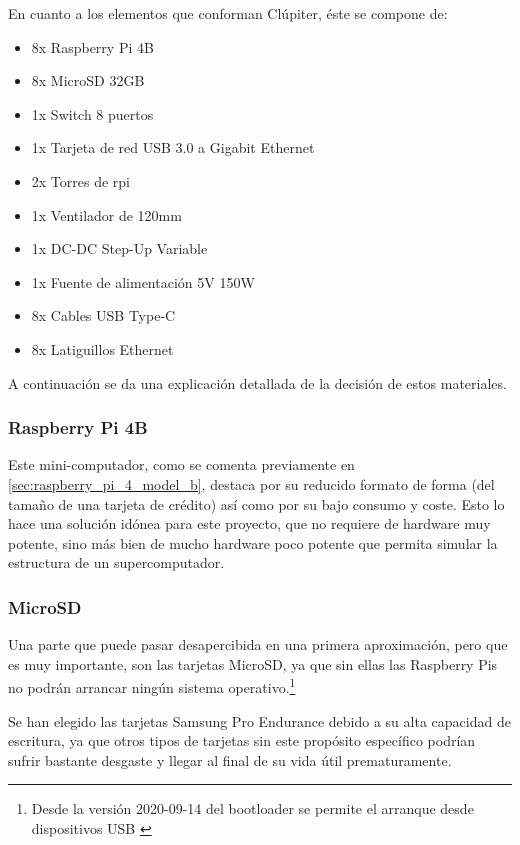 
En cuanto a los elementos que conforman Clúpiter, éste se compone de:
\begin{itemize}
    \item 8x Raspberry Pi 4B
    \item 8x MicroSD 32GB
    \item 1x Switch 8 puertos
    \item 1x Tarjeta de red USB 3.0 a Gigabit Ethernet 
    \item 2x Torres de \acrshort{rpi}
    \item 1x Ventilador de 120mm
    \item 1x DC-DC Step-Up Variable 
    \item 1x Fuente de alimentación 5V 150W
    \item 8x Cables USB Type-C
    \item 8x Latiguillos Ethernet
\end{itemize}

A continuación se da una explicación detallada de la decisión de estos materiales.

\subsubsection{Raspberry Pi 4B}
Este mini-computador, como se comenta previamente en \ref{sec:raspberry_pi_4_model_b}, destaca por su reducido formato de forma (del tamaño de una tarjeta de crédito) así como por su bajo consumo y coste. Esto lo hace una solución idónea para este proyecto, que no requiere de hardware muy potente, sino más bien de mucho hardware poco potente que permita simular la estructura de un supercomputador.

\subsubsection{MicroSD}
Una parte que puede pasar desapercibida en una primera aproximación, pero que es muy importante, son las tarjetas MicroSD, ya que sin ellas las Raspberry Pis no podrán arrancar ningún sistema operativo.\footnote{Desde la versión 2020-09-14 del bootloader se permite el arranque desde dispositivos USB \cite{rpibootloader20200903}}

Se han elegido las tarjetas Samsung Pro Endurance debido a su alta capacidad de escritura, ya que otros tipos de tarjetas sin este propósito específico podrían sufrir bastante desgaste y llegar al final de su vida útil prematuramente. 


